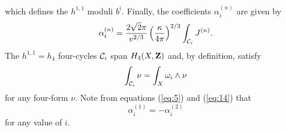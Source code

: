 \documentclass[a4paper,12pt]{article}
\numberwithin{equation}{section}
\theoremstyle{plain}
\begin{document}
%
which defines the $h^{1,1}$ moduli $b^{i}$. Finally, the coefficients
$\alpha_{i}^{(n)}$ are given by
%
\begin{equation}
\alpha_{i}^{(n)}=\frac{2\sqrt{2}\pi}{v^{2/3}}\left(\frac{\kappa}{4\pi}\right)^{2/3}
\int_{{\cal{C}}_{i}}{J^{(n)}}.
\label{eq:14}
\end{equation}
%
The $h^{1,1}=h_{4}$ four-cycles ${\cal{C}}_{i}$ span 
$H_{4}(X,{\bf Z \rm})$ and, by definition, satisfy
%
\begin{equation}
\int_{{\cal{C}}_{i}}{\nu}=\int_{X}{\omega_{i}\wedge \nu}
\label{eq:15}
\end{equation}
%
for any four-form $\nu$. Note from equations (\ref{eq:5}) and (\ref{eq:14})
that
%
\begin{equation}
\alpha_{i}^{(1)}=-\alpha_{i}^{(2)}
\label{eq:16}
\end{equation}
%
for any value of $i$. 
\end{document}
